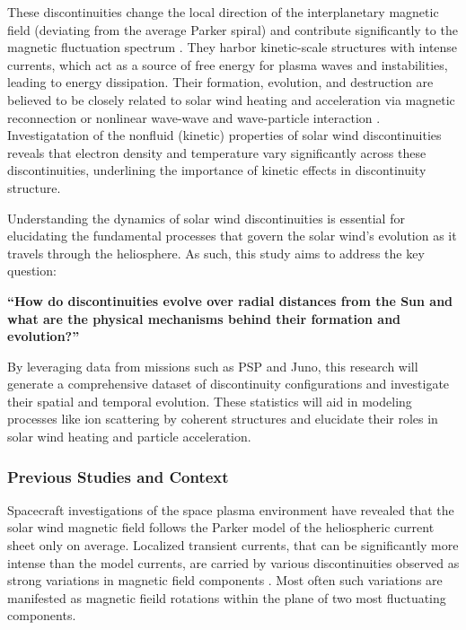 \documentclass[
  letterpaper,
  DIV=11,
  numbers=noendperiod]{scrartcl}
\begin{document}
These discontinuities change the local direction of the interplanetary magnetic field (deviating from the average Parker spiral) and contribute significantly to the magnetic fluctuation spectrum \citep{borovskyContributionStrongDiscontinuities2010}. They harbor kinetic-scale structures with intense currents, which act as a source of free energy for plasma waves and instabilities, leading to energy dissipation\citep{dmitrukTestParticleEnergization2004, macbrideTurbulentCascadeAU2008, osmanIntermittencyLocalHeating2012, tesseinAssociationSuprathermalParticles2013}. Their formation, evolution, and destruction are believed to be closely related to solar wind heating and acceleration via magnetic reconnection \citep{dmitrukTestParticleEnergization2004} or nonlinear wave-wave and wave-particle interaction \citep{medvedevDissipativeDynamicsCollisionless1997}. Investigatation of the nonfluid (kinetic) properties of solar wind discontinuities \citep{artemyevKineticNatureSolar2019} reveals that electron density and temperature vary significantly across these discontinuities, underlining the importance of kinetic effects in discontinuity structure.

Understanding the dynamics of solar wind discontinuities is essential for elucidating the fundamental processes that govern the solar wind's evolution as it travels through the heliosphere. As such, this study aims to address the key question:

\textbf{``How do discontinuities evolve over radial distances from the Sun and what are the physical mechanisms behind their formation and evolution?''}

By leveraging data from missions such as PSP and Juno, this research will generate a comprehensive dataset of discontinuity configurations and investigate their spatial and temporal evolution. These statistics will aid in modeling processes like ion scattering by coherent structures and elucidate their roles in solar wind heating and particle acceleration.

\subsubsection{Previous Studies and Context}\label{previous-studies-and-context}

Spacecraft investigations of the space plasma environment have revealed that the solar wind magnetic field follows the Parker model of the heliospheric current sheet only on average. Localized transient currents, that can be significantly more intense than the model currents, are carried by various discontinuities observed as strong variations in magnetic field components \citep{colburnDiscontinuitiesSolarWind1966, burlagaMicroscaleStructuresInterplanetary1968, turnerOrientationsRotationalTangential1971}. Most often such variations are manifested as magnetic fieild rotations within the plane of two most fluctuating components.
\end{document}
